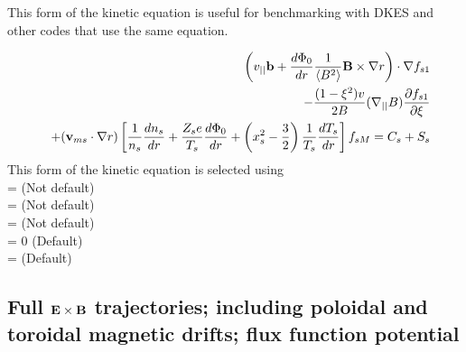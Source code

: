 This form of the kinetic equation is useful for benchmarking with DKES and other codes
that use the same equation.

\begin{eqnarray}
&&\left(v_{||}{\mathbf b} + \frac{d\Phi_0}{dr} \frac{1}{\left< B^2\right>} {\mathbf B}\times\nabla r \right) \cdot \nabla f_{s1} \\
&& - \frac{(1-\xi^2)v}{2B} (\nabla_{||} B)
 \frac{\partial f_{s1}}{\partial \xi} \nonumber \\
&&+ ({\mathbf v}_{ms} \cdot \nabla r) \left[ \frac{1}{n_s} \frac{dn_s}{dr} + \frac{Z_s e}{T_s} \frac{d\Phi_0}{dr} + \left(x_s^2-\frac{3}{2}\right) \frac{1}{T_s} \frac{dT_s}{dr}\right] f_{sM}
 = C_s + S_s \nonumber
\end{eqnarray}
This form of the kinetic equation is selected using \\
 = \false  \;\;\; (Not default) \\
 = \false \;\;\; (Not default) \\
 = \true \;\;\; (Not default) \\
 = 0 \;\;\; (Default) \\
 = \false \;\;\; (Default) %



\subsection{Full ${\mathbf E}\times{\mathbf B}$ trajectories; including poloidal and toroidal magnetic drifts; flux function potential}

